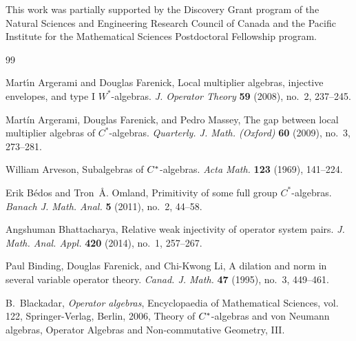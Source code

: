 \documentclass{amsart}
\theoremstyle{definition}
\theoremstyle{remark}
\numberwithin{equation}{section}
\begin{document}
This work was partially supported by
the Discovery Grant program of
the Natural Sciences and Engineering Research Council of Canada and 
the Pacific Institute for the Mathematical Sciences Postdoctoral Fellowship program.
 



\begin{thebibliography}{99}


Mart{\'{\i}}n Argerami and Douglas Farenick, Local multiplier algebras,
  injective envelopes, and type {I} {$W^*$}-algebras. \emph{J. Operator Theory}
  \textbf{59} (2008), no.~2, 237--245. %

Mart\'{i}n Argerami, Douglas Farenick, and Pedro Massey,  The gap between
  local multiplier algebras of {$C^*$}-algebras. \emph{Quarterly. J. Math. (Oxford)} \textbf{60}
  (2009), no.~3, 273--281. %

William Arveson,  Subalgebras of {$C\sp{\ast} $}-algebras. \emph{ Acta Math.}
  \textbf{123} (1969), 141--224. %

Erik B\'edos and Tron~\AA. Omland, Primitivity of some full group
  {$C^\ast$}-algebras. \emph{Banach J. Math. Anal.} \textbf{5} (2011), no.~2, 44--58.

Angshuman Bhattacharya, Relative weak injectivity of operator system
  pairs. \emph{J. Math. Anal. Appl.} \textbf{420} (2014), no.~1, 257--267.

Paul Binding, Douglas Farenick, and Chi-Kwong Li,  A dilation and norm in
  several variable operator theory.  \emph{Canad. J. Math.} \textbf{47} (1995), no.~3,
  449--461. %

B.~Blackadar, \emph{Operator algebras}, Encyclopaedia of Mathematical Sciences,
  vol. 122, Springer-Verlag, Berlin, 2006, Theory of $C\sp *$-algebras and von
  Neumann algebras, Operator Algebras and Non-commutative Geometry, III.
  



\end{thebibliography}
\end{document}
